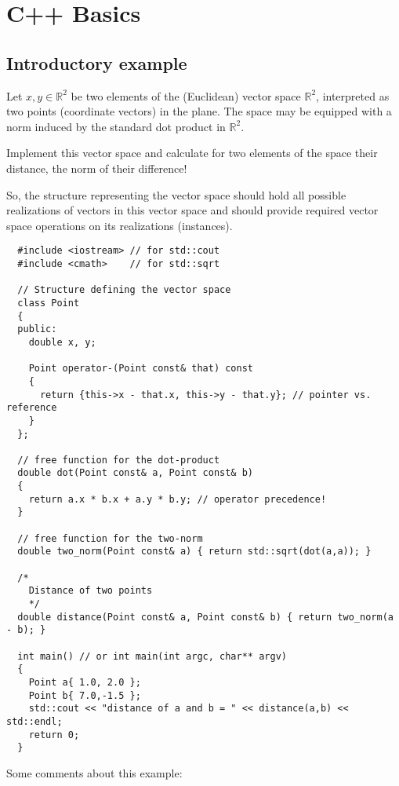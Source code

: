\chapter{C++ Basics\label{sec:basics}}
\section{Introductory example\label{sec:introductory-example}}

Let $x,y\in \mathbb{R}^2$ be two elements of the (Euclidean) vector space $\mathbb{R}^2$, interpreted as two points (coordinate vectors) in the plane. The space may be equipped with a norm induced by the standard dot product in $\mathbb{R}^2$.

Implement this vector space and calculate for two elements of the space their distance, \ie the norm of their difference!

So, the structure representing the vector space should hold all possible realizations of vectors in this vector space and should provide required vector space operations on its realizations (instances).


\begin{verbatim}
  #include <iostream> // for std::cout
  #include <cmath>    // for std::sqrt

  // Structure defining the vector space
  class Point
  {
  public:
    double x, y;

    Point operator-(Point const& that) const
    {
      return {this->x - that.x, this->y - that.y}; // pointer vs. reference
    }
  };

  // free function for the dot-product
  double dot(Point const& a, Point const& b)
  {
    return a.x * b.x + a.y * b.y; // operator precedence!
  }

  // free function for the two-norm
  double two_norm(Point const& a) { return std::sqrt(dot(a,a)); }

  /*
    Distance of two points
    */
  double distance(Point const& a, Point const& b) { return two_norm(a - b); }

  int main() // or int main(int argc, char** argv)
  {
    Point a{ 1.0, 2.0 };
    Point b{ 7.0,-1.5 };
    std::cout << "distance of a and b = " << distance(a,b) << std::endl;
    return 0;
  }
\end{verbatim}

Some comments about this example:

